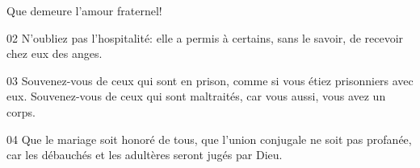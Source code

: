 Que demeure l’amour fraternel!

02 N’oubliez pas l’hospitalité: elle a permis à certains, sans le savoir, de recevoir chez eux des anges.

03 Souvenez-vous de ceux qui sont en prison, comme si vous étiez prisonniers avec eux. Souvenez-vous de ceux qui sont maltraités, car vous aussi, vous avez un corps.

04 Que le mariage soit honoré de tous, que l’union conjugale ne soit pas profanée, car les débauchés et les adultères seront jugés par Dieu.
